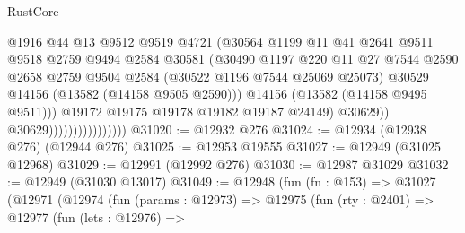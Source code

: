 \begin{lexlean}{RustCore}
\begin{coremodule}
                                          @1916
                                          @44
                                          @13
                                          @9512
                                          @9519
                                          @4721
                                          (@30564
                                            @1199
                                            @11
                                            @41
                                            @2641
                                            @9511
                                            @9518
                                            @2759
                                            @9494
                                            @2584
                                            @30581
                                            (@30490
                                              @1197
                                              @220
                                              @11
                                              @27
                                              @7544
                                              @2590
                                              @2658
                                              @2759
                                              @9504
                                              @2584
                                              (@30522 @1196 @7544 @25069 @25073)
                                              @30529
                                              @14156
                                              (@13582 (@14158 @9505 @2590)))
                                            @14156
                                            (@13582 (@14158 @9495 @9511)))
                                          @19172
                                          @19175
                                          @19178
                                          @19182
                                          @19187
                                          @24149)
                                        @30629))
                                    @30629))))))))))))))))
@31020 := @12932 @276
@31024 := @12934 (@12938 @276) (@12944 @276)
@31025 := @12953 @19555
@31027 := @12949 (@31025 @12968)
@31029 := @12991 (@12992 @276)
@31030 := @12987 @31029
@31032 := @12949 (@31030 @13017)
@31049 := @12948
    (fun (fn : @153) =>
    @31027
      (@12971
        (@12974
          (fun (params : @12973) =>
          @12975
            (fun (rty : @2401) =>
            @12977
              (fun (lets : @12976) =>

\end{coremodule}
\end{lexlean}
